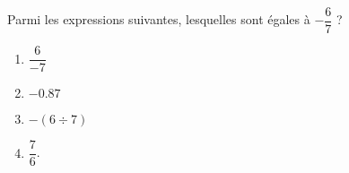 
\begin{exercice}[\ldots /2]\label{exosmath-0772}

    Parmi les expressions suivantes, lesquelles sont égales à \( -\dfrac{ 6 }{ 7 }\) ?
    \begin{multicols}{2}
        \begin{enumerate}
            \item
                \( \dfrac{ 6 }{ -7 }\)
            \item
                \( -0.87\)
            \item
                \( -(6\div 7)\)
            \item
                \( \dfrac{ 7 }{ 6 }\).
        \end{enumerate}
    \end{multicols}

\end{exercice}
